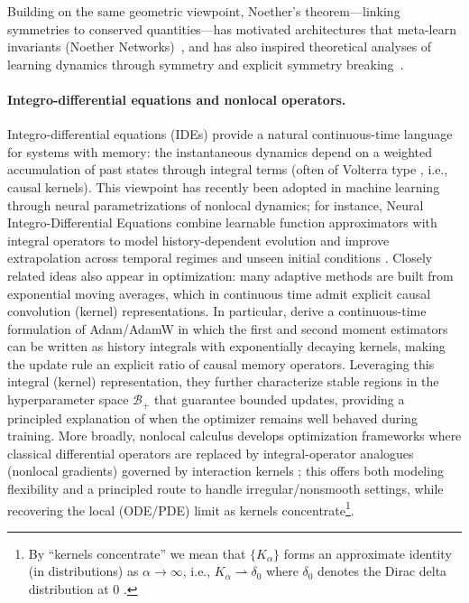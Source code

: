 \documentclass{article} %
\begin{document}
Building on the same geometric viewpoint, Noether’s theorem—linking symmetries to conserved quantities—has motivated architectures that meta-learn invariants (Noether Networks)~\cite{alet2021noether}, and has also inspired theoretical analyses of learning dynamics through symmetry and explicit symmetry breaking~\cite{tanaka2021noether}. 


\paragraph{Integro-differential equations and nonlocal operators.}
Integro-differential equations (IDEs) provide a natural continuous-time language for systems with memory: the instantaneous dynamics depend on a weighted accumulation of past states through integral terms (often of Volterra type \cite{Tricomi1985IntegralEquations}, i.e., causal kernels). This viewpoint has recently been adopted in machine learning through neural parametrizations of nonlocal dynamics; for instance, Neural Integro-Differential Equations combine learnable function approximators with integral operators to model history-dependent evolution and improve extrapolation across temporal regimes and unseen initial conditions \cite{zappala2022neural}. Closely related ideas also appear in optimization: many adaptive methods are built from exponential moving averages, which in continuous time admit explicit causal convolution (kernel)
representations. In particular, \cite{gould2024} derive a continuous-time formulation of Adam/AdamW in which the first and second moment estimators can be written as history integrals with exponentially decaying kernels, making the update rule an explicit ratio of causal memory operators. Leveraging this integral (kernel) representation, they further characterize stable regions in the hyperparameter space $\mathcal{B}_+$ that guarantee bounded updates, providing a principled explanation of when the optimizer remains well behaved during training.
More broadly, nonlocal calculus develops optimization frameworks where classical differential operators are replaced by integral-operator analogues (nonlocal gradients) governed by interaction kernels \cite{SriramNonlocal}; this offers both modeling flexibility and a principled route to handle irregular/nonsmooth settings, while recovering the local (ODE/PDE) limit as kernels concentrate\footnote{By ``kernels concentrate'' we mean that \(\{K_\alpha\}\) forms an approximate identity (in distributions) as \(\alpha\to\infty\), i.e., \(K_\alpha \rightharpoonup \delta_0\) where $\delta_0$ denotes the Dirac delta distribution at \(0\)  \cite{Vladimirov_GF}.}. 
\end{document}
